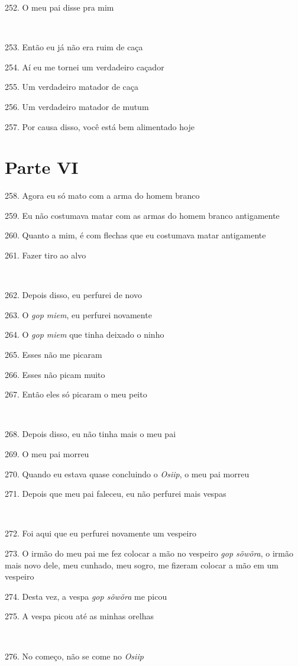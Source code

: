 252. O meu pai disse pra mim

~

253. Então eu já não era ruim de caça

254. Aí eu me tornei um verdadeiro caçador

255. Um verdadeiro matador de caça

256. Um verdadeiro matador de mutum

257. Por causa disso, você está bem alimentado hoje

\section{Parte VI}

258. Agora eu só mato com a arma do homem branco

259. Eu não costumava matar com as armas do homem branco antigamente

260. Quanto a mim, é com flechas que eu costumava matar antigamente

261. Fazer tiro ao alvo

~

262. Depois disso, eu perfurei de novo

263. O \emph{gop miem}, eu perfurei novamente

264. O \emph{gop miem} que tinha deixado o ninho

265. Esses não me picaram

266. Esses não picam muito

267. Então eles só picaram o meu peito

~

268. Depois disso, eu não tinha mais o meu pai

269. O meu pai morreu

270. Quando eu estava quase concluindo o \emph{Osiip}, o meu pai morreu

271. Depois que meu pai faleceu, eu não perfurei mais vespas

~

272. Foi aqui que eu perfurei novamente um vespeiro

273. O irmão do meu pai me fez colocar a mão no vespeiro \emph{gop
sõwõra}, o irmão mais novo dele, meu cunhado, meu sogro, me fizeram
colocar a mão em um vespeiro

274. Desta vez, a vespa \emph{gop sõwõra} me picou

275. A vespa picou até as minhas orelhas

~

276. No começo, não se come no \emph{Osiip}

